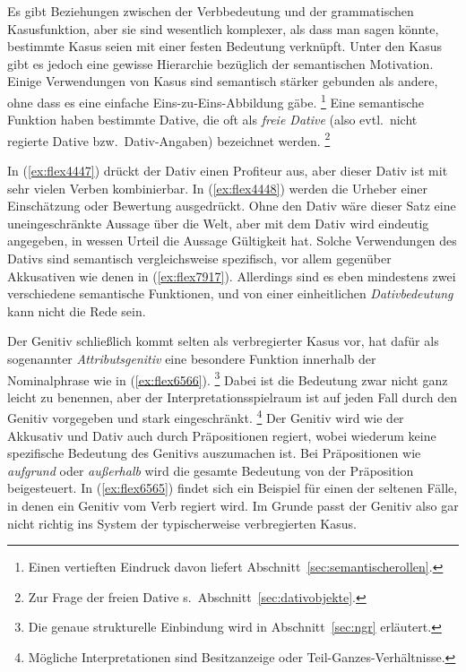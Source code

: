 Es gibt Beziehungen zwischen der Verbbedeutung und der grammatischen Kasusfunktion, aber sie sind wesentlich komplexer, als dass man sagen könnte, bestimmte Kasus seien mit einer festen Bedeutung verknüpft.
Unter den Kasus gibt es jedoch eine gewisse Hierarchie bezüglich der semantischen Motivation.
Einige Verwendungen von Kasus sind semantisch stärker gebunden als andere, ohne dass es eine einfache Eins-zu-Eins-Abbildung gäbe.%
\footnote{Einen vertieften Eindruck davon liefert Abschnitt~\ref{sec:semantischerollen}.}
Eine semantische Funktion haben \zB bestimmte Dative, die oft als \textit{freie Dative} (also evtl.\ nicht regierte Dative bzw.\ Dativ-Angaben) bezeichnet werden.%
\footnote{Zur Frage der freien Dative s.\ Abschnitt~\ref{sec:dativobjekte}.}

\begin{exe}
  \ex \label{ex:flex4447}
  \begin{xlist}
  \end{xlist}
  \ex \label{ex:flex4448}
  \begin{xlist}
  \end{xlist}
\end{exe}

In (\ref{ex:flex4447}) drückt der Dativ einen Profiteur aus, aber dieser Dativ ist mit sehr vielen Verben kombinierbar.
In (\ref{ex:flex4448}) werden die Urheber einer Einschätzung oder Bewertung ausgedrückt.
Ohne den Dativ wäre dieser Satz eine uneingeschränkte Aussage über die Welt, aber mit dem Dativ wird eindeutig angegeben, in wessen Urteil die Aussage Gültigkeit hat.
Solche Verwendungen des Dativs sind semantisch vergleichsweise spezifisch, vor allem gegenüber \zB Akkusativen wie denen in (\ref{ex:flex7917}).
Allerdings sind es eben mindestens zwei verschiedene semantische Funktionen, und von einer einheitlichen \textit{Dativbedeutung} kann nicht die Rede sein.

Der Genitiv schließlich kommt selten als verbregierter Kasus vor, hat dafür als sogenannter \textit{Attributsgenitiv} eine besondere Funktion innerhalb der Nominalphrase wie in (\ref{ex:flex6566}).%
\footnote{Die genaue strukturelle Einbindung wird in Abschnitt~\ref{sec:ngr} erläutert.}
Dabei ist die Bedeutung zwar nicht ganz leicht zu benennen, aber der Interpretationsspielraum ist auf jeden Fall durch den Genitiv vorgegeben und stark eingeschränkt.%
\footnote{Mögliche Interpretationen sind Besitzanzeige oder Teil-Ganzes-Verhältnisse.}
Der Genitiv wird wie der Akkusativ und Dativ auch durch Präpositionen regiert, wobei wiederum keine spezifische Bedeutung des Genitivs auszumachen ist.
Bei Präpositionen wie \textit{aufgrund} oder \textit{außerhalb} wird die gesamte Bedeutung von der Präposition beigesteuert.
In (\ref{ex:flex6565}) findet sich ein Beispiel für einen der seltenen Fälle, in denen ein Genitiv vom Verb regiert wird.
Im Grunde passt der Genitiv also gar nicht richtig ins System der typischerweise verbregierten Kasus.

